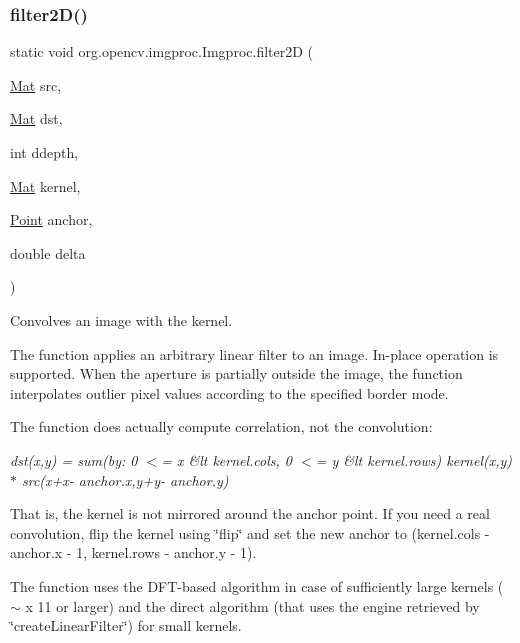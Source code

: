 \subsubsection{\texorpdfstring{filter2\+D()}{filter2D()}\hspace{0.1cm}{\footnotesize\ttfamily [2/3]}}
{\footnotesize\ttfamily static void org.\+opencv.\+imgproc.\+Imgproc.\+filter2D (\begin{DoxyParamCaption}\item[{\mbox{\hyperlink{classorg_1_1opencv_1_1core_1_1_mat}{Mat}}}]{src,  }\item[{\mbox{\hyperlink{classorg_1_1opencv_1_1core_1_1_mat}{Mat}}}]{dst,  }\item[{int}]{ddepth,  }\item[{\mbox{\hyperlink{classorg_1_1opencv_1_1core_1_1_mat}{Mat}}}]{kernel,  }\item[{\mbox{\hyperlink{classorg_1_1opencv_1_1core_1_1_point}{Point}}}]{anchor,  }\item[{double}]{delta }\end{DoxyParamCaption})\hspace{0.3cm}{\ttfamily [static]}}

Convolves an image with the kernel.

The function applies an arbitrary linear filter to an image. In-\/place operation is supported. When the aperture is partially outside the image, the function interpolates outlier pixel values according to the specified border mode.

The function does actually compute correlation, not the convolution\+:

{\itshape dst(x,y) = sum(by\+: 0 $<$= x\textquotesingle{} \&lt kernel.\+cols, 0 $<$= y\textquotesingle{} \&lt kernel.\+rows) kernel(x\textquotesingle{},y\textquotesingle{})$\ast$ src(x+x\textquotesingle{}-\/ anchor.\+x,y+y\textquotesingle{}-\/ anchor.\+y)}

That is, the kernel is not mirrored around the anchor point. If you need a real convolution, flip the kernel using \char`\"{}flip\char`\"{} and set the new anchor to {\ttfamily (kernel.\+cols -\/ anchor.\+x -\/ 1, kernel.\+rows -\/ anchor.\+y -\/ 1)}.

The function uses the D\+F\+T-\/based algorithm in case of sufficiently large kernels ($\sim${ x 11} or larger) and the direct algorithm (that uses the engine retrieved by \char`\"{}create\+Linear\+Filter\char`\"{}) for small kernels.


